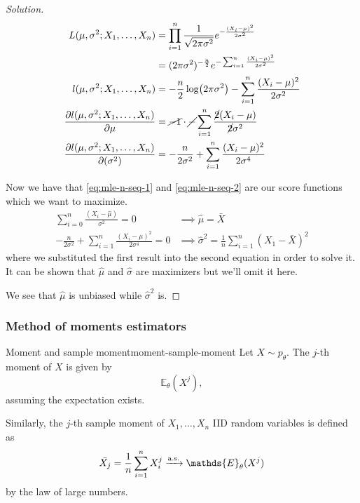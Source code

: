 \documentclass[12pt]{extarticle}
\newcommand{\E}{\mathds{E}}
\newcommand{\convas}{\xrightarrow{\operatorfont a.s.}}
\begin{document}
\begin{proof}[Solution]
    \begin{align}
        L(\mu,\sigma^2; X_1, \dots, X_n)                   & = \prod_{i = 1}^n \frac{1}{\sqrt{2 \pi \sigma^2}} e^{-\frac{(X_i - \mu)^2}{2 \sigma^2}}                                 \\
                                                           & = (2 \pi \sigma^2)^{-\frac{n}{2}} e^{- \sum_{i = 1}^n \frac{(X_i - \mu)^2}{2 \sigma^2}}                                 \\
        l(\mu,\sigma^2; X_1, \dots, X_n)                   & = -\frac{n}{2}\log(2 \pi \sigma^2) - \sum_{i = 1}^n \frac{(X_i - \mu)^2}{2 \sigma^2}                                    \\
        \pdv{l(\mu,\sigma^2; X_1, \dots, X_n)}{\mu}        & = \cancel{-1 }\cdot \cancel{-} \sum_{i = 1}^n \frac{\cancel{2}(X_i - \mu)}{\cancel{2} \sigma^2}  \label{eq:mle-n-seq-1} \\
        \pdv{l(\mu,\sigma^2; X_1, \dots, X_n)}{(\sigma^2)} & = -\frac{n}{2 \sigma^2} + \sum_{i = 1}^n \frac{(X_i - \mu)^2}{2 \sigma^4} \label{eq:mle-n-seq-2}
    \end{align}

    Now we have that \cref{eq:mle-n-seq-1} and \cref{eq:mle-n-seq-2} are our score functions which we want to maximize.
    \begin{align}
        \sum_{i = 0}^{n} \frac{(X_i - \hat \mu)}{\sigma^2} = 0                      & \implies \hat \mu = \bar X                                            \\
        -\frac{n}{2 \sigma^2} + \sum_{i = 1}^n \frac{(X_i - \mu)^2}{2 \sigma^4} = 0 & \implies \hat{\sigma}^2 = \frac{1}{n} \sum_{i = 1}^n (X_1 - \bar X)^2
    \end{align}
    where we substituted the first result into the second equation in order to solve it.
    It can be shown that $\hat \mu$ and $\hat \sigma$ are maximizers but we'll omit it here.

    We see that $\hat \mu$ is unbiased while $\hat \sigma ^2$ is.
\end{proof}

\subsubsection{Method of moments estimators}

\begin{definition}{Moment and sample moment}{moment-sample-moment}
    Let $X \sim p_\theta$. The $j$-th moment of $X$ is given by
    \begin{equation}
        \E_\theta(X^j),
    \end{equation}
    assuming the expectation exists.

    Similarly, the $j$-th sample moment of $X_1,\dots, X_n$ IID random variables is defined as
    \begin{equation}
        \bar{X_j} = \frac{1}{n} \sum_{i = 1}^n X_i^j \convas \E_\theta(X^j)
    \end{equation}
    by the law of large numbers.
\end{definition}
\end{document}
